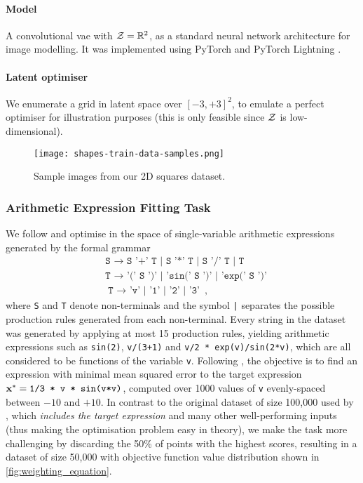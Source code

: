 \paragraph{Model} A convolutional \gls{vae} with $\mathcal{Z}=\mathbb{R}^2$,
as a standard neural network architecture for image modelling.
It was implemented using PyTorch \citep{paszke2019pytorch} and PyTorch Lightning \citep{falcon2019pytorch}.
\paragraph{Latent optimiser} We enumerate a grid in latent space over $[-3,+3]^2$,
to emulate a perfect optimiser for illustration purposes (this is only feasible since $\mathcal{Z}$ is low-dimensional).

\begin{figure}[ht]
    \centering
    \texttt{[image: shapes-train-data-samples.png]}
    \caption{Sample images from our 2D squares dataset.}
    \label{fig:shape-samples}
\end{figure}

\subsubsection{Arithmetic Expression Fitting Task}
We follow \citet{kusner_grammar_2017} and optimise in the space of single-variable
arithmetic expressions generated by the formal grammar
\begin{align*}
    &\texttt{S $\rightarrow$ S '+' T | S '*' T | S '/' T | T}\\
    &\texttt{T $\rightarrow$ '(' S ')' | 'sin(' S ')' | 'exp(' S ')'}\\
    &\texttt{T $\rightarrow$ 'v' | '1' | '2' | '3'}\ ,
\end{align*}
where \texttt{S} and \texttt{T} denote non-terminals and the symbol \texttt{|}
separates the possible production rules generated from each non-terminal.
Every string in the dataset was generated by applying at most 15 production rules,
yielding arithmetic expressions such as \texttt{sin(2)}, \texttt{v/(3+1)} and \texttt{v/2 * exp(v)/sin(2*v)},
which are all considered to be functions of the variable \texttt{v}.
Following \citet{kusner_grammar_2017}, the objective is to find an expression
with minimal mean squared error to the target expression $\mathbf{x}^* = \texttt{1/3 * v * sin(v*v)}$,
computed over 1000 values of \texttt{v} evenly-spaced between $-10$ and $+10$.
In contrast to the original dataset of size 100,000 used by \citet{kusner_grammar_2017},
which \emph{includes the target expression} and many other well-performing inputs
(thus making the optimisation problem easy in theory), we make the task more challenging
by discarding the 50\% of points with the highest scores, resulting in a dataset of
size 50,000 with objective function value distribution shown in \cref{fig:weighting_equation}.
